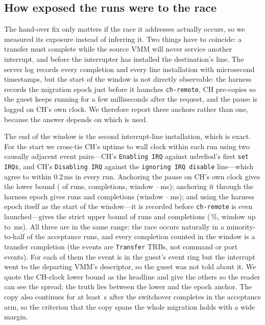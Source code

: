 \documentclass[10pt,conference]{IEEEtran}
\newcommand{\code}[1]{\texttt{#1}}
\begin{document}
\subsection{How exposed the runs were to the race}
\label{sec:exposure}
The hand-over fix only matters if the race it addresses actually occurs, so we
measured its exposure instead of inferring it. Two things have to coincide: a
transfer must complete while the source VMM will never service another
interrupt, and before the interrupter has installed the destination's line. The
server log records every completion and every line installation with microsecond
timestamps, but the start of the window is not directly observable: the harness
records the migration epoch just before it launches \code{ch-remote}, CH
pre-copies so the guest keeps running for a few milliseconds after the request,
and the pause is logged on CH's own clock. We therefore report three anchors
rather than one, because the answer depends on which is used.

The end of the window is the second interrupt-line installation, which is
exact. For the start we cross-tie CH's uptime to wall clock within each run using
two causally adjacent event pairs---CH's \code{Enabling IRQ} against usbvfiod's
first \code{set IRQs}, and CH's \code{Disabling IRQ} against the
\code{ignoring IRQ disable} line---which agree to within 0.2\,ms in every run.
Anchoring the pause on CH's own clock gives the lower bound (\ExposureRuns{} of
\ExposureMeasured{} runs, \ExposureCompletions{} completions, window
\ExposureWindowMin--\ExposureWindowMax\,ms); anchoring it through the harness
epoch gives \ExposureEpochRuns{} runs and \ExposureEpochCompletions{}
completions (window \ExposureEpochWindowMin--\ExposureEpochWindowMax\,ms); and
using the harness epoch itself as the start of the window---it is recorded
before \code{ch-remote} is even launched---gives the strict upper bound of
\ExposureUpperRuns{} runs and \ExposureUpperCompletions{} completions
(\ExposureUpperRate\,\%, window up to \ExposureUpperWindowMax\,ms). All three are
in the same range: the race occurs naturally in a minority-to-half of the
acceptance runs, and every completion counted in the window is a transfer
completion (the events are \code{Transfer} TRBs, not command or port events).
For each of them the event is in the guest's event ring but the interrupt went
to the departing VMM's descriptor, so the guest was not told about it. We quote
the CH-clock lower bound as the headline and give the others so the reader can
see the spread; the truth lies between the lower and the epoch anchor.
The copy also continues for at least \SpanMarginMin\,s after the switchover
completes in the acceptance arm, so the criterion that the copy spans the whole
migration holds with a wide margin.
\end{document}
